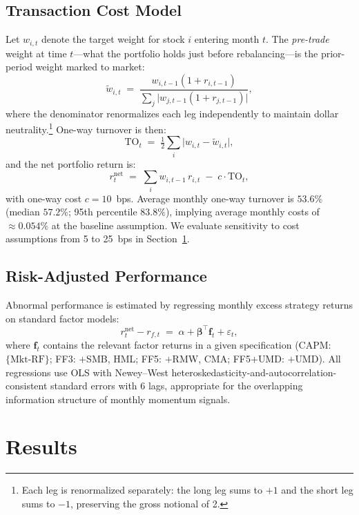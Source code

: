 \documentclass[11pt]{article}
\begin{document}
\subsection{Transaction Cost Model}

Let $w_{i,t}$ denote the target weight for stock $i$ entering month $t$. The
\emph{pre-trade} weight at time $t$---what the portfolio holds just before
rebalancing---is the prior-period weight marked to market:
\[
  \tilde{w}_{i,t} \;=\; \frac{w_{i,t-1}(1 + r_{i,t-1})}
    {\displaystyle\sum_j \bigl|w_{j,t-1}(1 + r_{j,t-1})\bigr|},
\]
where the denominator renormalizes each leg independently to maintain dollar
neutrality.\footnote{Each leg is renormalized separately: the long leg sums to $+1$
and the short leg sums to $-1$, preserving the gross notional of 2.}
One-way turnover is then:
\[
  \text{TO}_t \;=\; \tfrac{1}{2} \sum_i \bigl| w_{i,t} - \tilde{w}_{i,t} \bigr|,
\]
and the net portfolio return is:
\[
  r^{\text{net}}_t \;=\; \sum_i w_{i,t-1}\,r_{i,t} \;-\; c \cdot \text{TO}_t,
\]
with one-way cost $c = 10$~bps. Average monthly one-way turnover is $53.6\%$ (median
$57.2\%$; 95th percentile $83.8\%$), implying average monthly costs of $\approx0.054\%$
at the baseline assumption. We evaluate sensitivity to cost assumptions from 5 to 25~bps
in Section~\ref{sec:results}.

\subsection{Risk-Adjusted Performance}

Abnormal performance is estimated by regressing monthly excess strategy returns on
standard factor models:
\[
  r^{\text{net}}_t - r_{f,t} \;=\; \alpha + \boldsymbol{\beta}^\top \mathbf{f}_t + \varepsilon_t,
\]
where $\mathbf{f}_t$ contains the relevant factor returns in a given specification
(CAPM: $\{\text{Mkt-RF}\}$; FF3: $+$SMB, HML; FF5: $+$RMW, CMA; FF5$+$UMD: $+$UMD).
All regressions use OLS with Newey--West heteroskedasticity-and-autocorrelation-consistent
standard errors with 6 lags, appropriate for the overlapping information structure of
monthly momentum signals.

\section{Results}
\label{sec:results}
\end{document}
